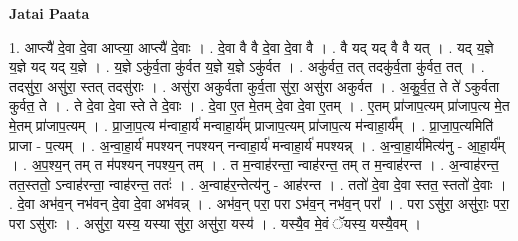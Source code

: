 \documentclass[17pt]{extarticle}
\begin{document}
\textbf{Jatai Paata} \newline

1. आप्त्यै॑ दे॒वा दे॒वा आप्त्या॒ आप्त्यै॑ दे॒वाः । . दे॒वा वै वै दे॒वा दे॒वा वै । . वै यद् यद् वै वै यत् । . यद् य॒ज्ञे य॒ज्ञे यद् यद् य॒ज्ञे । . य॒ज्ञे ऽकु॑र्व॒ता कु॑र्वत य॒ज्ञे य॒ज्ञे ऽकु॑र्वत । . अकु॑र्वत॒ तत् तदकु॑र्व॒ता कु॑र्वत॒ तत् । . तदसु॑रा॒ असु॑रा॒ स्तत् तदसु॑राः । . असु॑रा अकुर्वता कुर्व॒ता सु॑रा॒ असु॑रा अकुर्वत । . अ॒कु॒र्व॒त॒ ते ते॑ ऽकुर्वता कुर्वत॒ ते । . ते दे॒वा दे॒वा स्ते ते दे॒वाः । . दे॒वा ए॒त मे॒तम् दे॒वा दे॒वा ए॒तम् । . ए॒तम् प्रा॑जाप॒त्यम् प्रा॑जाप॒त्य मे॒त मे॒तम् प्रा॑जाप॒त्यम् । . प्रा॒जा॒प॒त्य म॑न्वाहा॒र्य॑ मन्वाहा॒र्य॑म् प्राजाप॒त्यम् प्रा॑जाप॒त्य म॑न्वाहा॒र्य᳚म् । . प्रा॒जा॒प॒त्यमिति॑ प्राजा - प॒त्यम् । . अ॒न्वा॒हा॒र्य॑ मपश्यन् नपश्यन् नन्वाहा॒र्य॑ मन्वाहा॒र्य॑ मपश्यन्न् । . अ॒न्वा॒हा॒र्य॑मित्य॑नु - आ॒हा॒र्य᳚म् । . अ॒प॒श्य॒न् तम् त म॑पश्यन् नपश्य॒न् तम् । . त म॒न्वाह॑रन्ता॒ न्वाह॑रन्त॒ तम् त म॒न्वाह॑रन्त । . अ॒न्वाह॑रन्त॒ तत॒स्ततो॒ ऽन्वाह॑रन्ता॒ न्वाह॑रन्त॒ ततः॑ । . अ॒न्वाह॑र॒न्तेत्य॑नु - आह॑रन्त । . ततो॑ दे॒वा दे॒वा स्तत॒ स्ततो॑ दे॒वाः । . दे॒वा अभ॑व॒न् नभ॑वन् दे॒वा दे॒वा अभ॑वन्न् । . अभ॑व॒न् परा॒ परा ऽभ॑व॒न् नभ॑व॒न् परा᳚ । . परा ऽसु॑रा॒ असु॑राः॒ परा॒ परा ऽसु॑राः । . असु॑रा॒ यस्य॒ यस्या सु॑रा॒ असु॑रा॒ यस्य॑ । . यस्यै॒व मे॒वं ॅयस्य॒ यस्यै॒वम् । \newline
\end{document}
